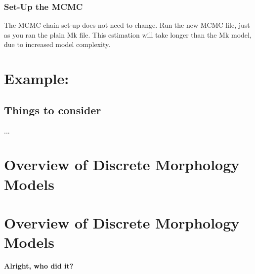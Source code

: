 \medskip
\subsubsection{Set-Up the MCMC}

The MCMC chain set-up does not need to change. 
Run the new MCMC file, just as you ran the plain Mk file.
This estimation will take longer than the Mk model, due to increased model complexity. \par


\section{Example: }

\subsection{Things to consider}

...


\section{Overview of Discrete Morphology Models} \label{sec:dm_simple}

\section{Overview of Discrete Morphology Models} \label{sec:dm_complex}
{\bf {} Alright, who did it?}

\newpage

